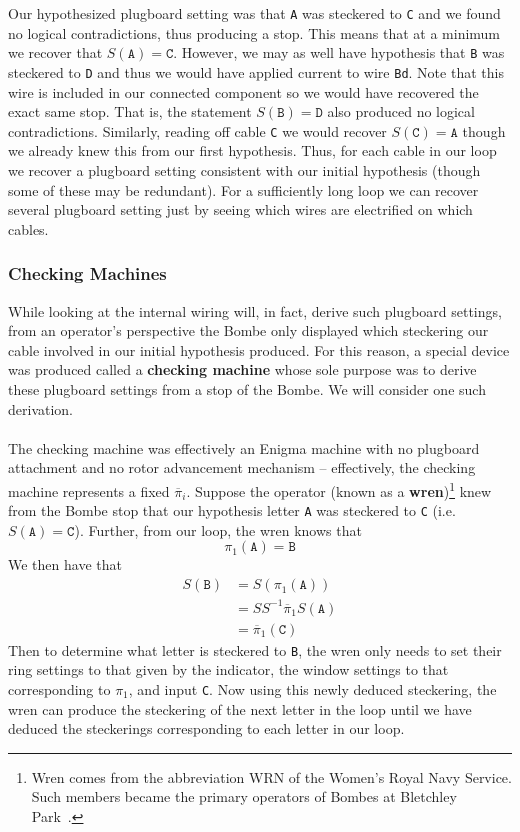 Our hypothesized plugboard setting was that \texttt{A} was steckered
to \texttt{C} and we found no logical contradictions, thus producing a
stop. This means that at a minimum we recover that $S(\texttt{A}) =
\texttt{C}$. However, we may as well have hypothesis that \texttt{B}
was steckered to \texttt{D} and thus we would have applied current to
wire \texttt{Bd}. Note that this wire is included in our connected
component so we would have recovered the exact same stop. That is,
the statement $S(\texttt{B}) = \texttt{D}$ also produced no logical
contradictions. Similarly, reading off cable \texttt{C} we would
recover $S(\texttt{C}) = \texttt{A}$ though we already knew this from
our first hypothesis. Thus, for each cable in our loop we recover a
plugboard setting consistent with our initial hypothesis (though some
of these may be redundant). For a sufficiently long loop we can
recover several plugboard setting just by seeing which wires are
electrified on which cables.
\subsubsection{Checking Machines}
While looking at the internal wiring will, in fact, derive such
plugboard settings, from an operator's perspective the Bombe only
displayed which steckering our cable involved in our initial
hypothesis produced. For this reason, a special device was produced
called a {\bf{checking machine}} whose sole purpose was to derive
these plugboard settings from a stop of the Bombe. We will consider
one such derivation.
\\\\The checking machine was effectively an Enigma machine with no
plugboard attachment and no rotor advancement mechanism --
effectively, the checking machine represents a fixed
$\overline\pi_i$. Suppose the operator (known as a
{\bf{wren}})\footnote{Wren comes from the abbreviation WRN of the
  Women's Royal Navy Service. Such members became the primary operators
of Bombes at Bletchley Park~\cite[pp.~58,97]{smith2015hidden}.} knew from the Bombe stop that our
hypothesis letter \texttt{A} was steckered to \texttt{C} (i.e.\ $S(\texttt{A}) = \texttt{C}$). Further, from our loop, the wren knows that
\[
  \pi_1(\texttt{A}) = \texttt{B}
\]
We then have that
\begin{align*}
  S(\texttt{B}) & = S(\pi_1(\texttt{A}))                \\
  & = SS^{-1}\overline\pi_1 S(\texttt{A}) \\
  & = \overline\pi_1(\texttt{C})
\end{align*}
Then to determine what letter is steckered to \texttt{B}, the wren
only needs to set their ring settings to that given by the indicator,
the window settings to that corresponding to $\pi_1$, and input
\texttt{C}. Now using this newly deduced steckering, the wren can
produce the steckering of the next letter in the loop until we have
deduced the steckerings corresponding to each letter in our loop.

